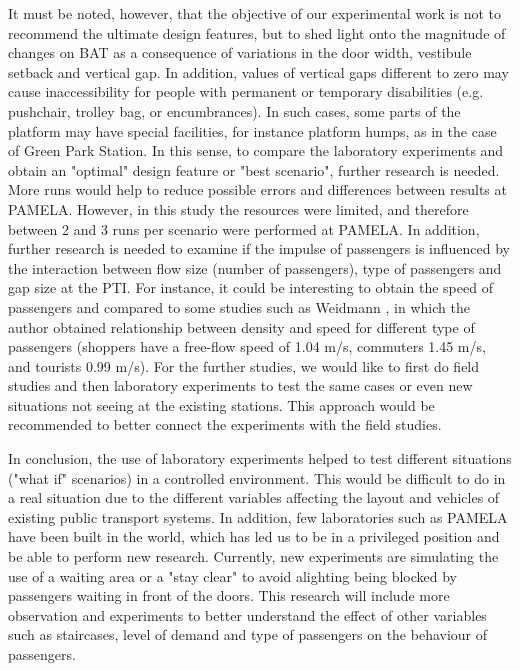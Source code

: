 It must be noted, however, that the objective of our experimental work is not to recommend the ultimate design features, but to shed light onto the magnitude of changes on BAT as a consequence of variations in the door width, vestibule setback and vertical gap. In addition, values of vertical gaps different to zero may cause inaccessibility for people with permanent or temporary disabilities (e.g. pushchair, trolley bag, or encumbrances). In such cases, some parts of the platform may have special facilities, for instance platform humps, as in the case of Green Park Station. In this sense, to compare the laboratory experiments and obtain an "optimal" design feature or "best scenario", further research is needed. More runs would help to reduce possible errors and differences between results at PAMELA. However, in this study the resources were limited, and therefore between 2 and 3 runs per scenario were performed at PAMELA. In addition, further research is needed to examine if the impulse of passengers is influenced by the interaction between flow size (number of passengers), type of passengers and gap size at the PTI. For instance, it could be interesting to obtain the speed of passengers and compared to some studies such as Weidmann \cite{Ref43}, in which the author obtained relationship between density and speed for different type of passengers (shoppers have a free-flow speed of 1.04 m/s, commuters 1.45 m/s, and tourists 0.99 m/s). For the further studies, we would like to first do field studies and then laboratory experiments to test the same cases or even new situations not seeing at the existing stations. This approach would be recommended to better connect the experiments with the field studies. 

In conclusion, the use of laboratory experiments helped to test different situations ("what if" scenarios) in a controlled environment. This would be difficult to do in a real situation due to the different variables affecting the layout and vehicles of existing public transport systems. In addition, few laboratories such as PAMELA have been built in the world, which has led us to be in a privileged position and be able to perform new research. Currently, new experiments are simulating the use of a waiting area or a "stay clear" to avoid alighting being blocked by passengers waiting in front of the doors. This research will include more observation and experiments to better understand the effect of other variables such as staircases, level of demand and type of passengers on the behaviour of passengers.